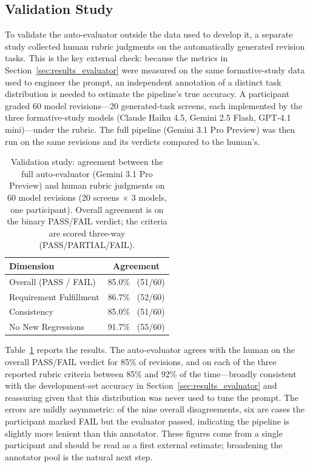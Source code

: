 \documentclass[sigconf,nonacm]{acmart}
\begin{document}
\subsection{Validation Study}
\label{sec:results_validation}

To validate the auto-evaluator outside the data used to develop it, a separate study collected human rubric judgments on the automatically generated revision tasks. This is the key external check: because the metrics in Section~\ref{sec:results_evaluator} were measured on the same formative-study data used to engineer the prompt, an independent annotation of a distinct task distribution is needed to estimate the pipeline's true accuracy. A participant graded 60 model revisions—20 generated-task screens, each implemented by the three formative-study models (Claude Haiku 4.5, Gemini 2.5 Flash, GPT-4.1 mini)—under the rubric. The full pipeline (Gemini 3.1 Pro Preview) was then run on the same revisions and its verdicts compared to the human's.

\begin{table}[t]
\centering
\small
\caption{Validation study: agreement between the full auto-evaluator (Gemini 3.1 Pro Preview) and human rubric judgments on 60 model revisions (20 screens $\times$ 3 models, one participant). Overall agreement is on the binary PASS/FAIL verdict; the criteria are scored three-way (PASS/PARTIAL/FAIL).}
\label{tab:validation}
\begin{tabular}{lc}
\toprule
\textbf{Dimension} & \textbf{Agreement} \\
\midrule
Overall (PASS / FAIL)       & 85.0\% \ (51/60) \\
\addlinespace
Requirement Fulfillment     & 86.7\% \ (52/60) \\
Consistency                 & 85.0\% \ (51/60) \\
No New Regressions          & 91.7\% \ (55/60) \\
\bottomrule
\end{tabular}
\end{table}

Table~\ref{tab:validation} reports the results. The auto-evaluator agrees with the human on the overall PASS/FAIL verdict for 85\% of revisions, and on each of the three reported rubric criteria between 85\% and 92\% of the time—broadly consistent with the development-set accuracy in Section~\ref{sec:results_evaluator} and reassuring given that this distribution was never used to tune the prompt. The errors are mildly asymmetric: of the nine overall disagreements, six are cases the participant marked FAIL but the evaluator passed, indicating the pipeline is slightly more lenient than this annotator. These figures come from a single participant and should be read as a first external estimate; broadening the annotator pool is the natural next step.
\end{document}

